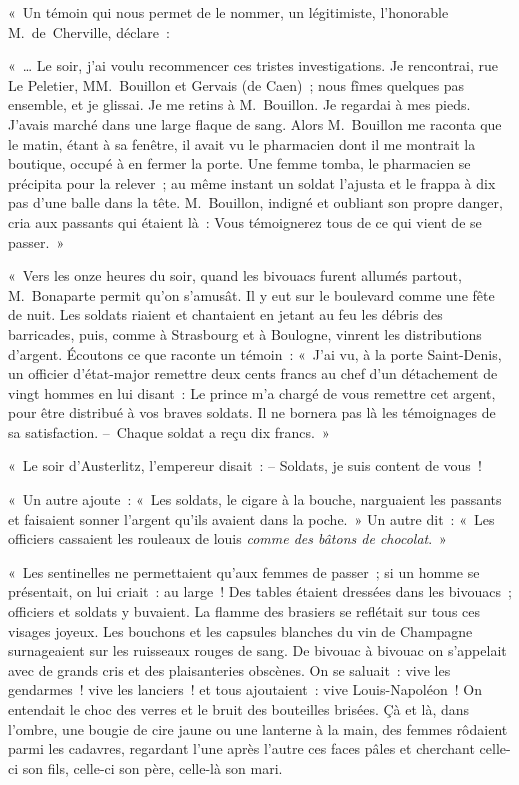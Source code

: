 \documentclass[french,twoside]{book} %
\newenvironment{quoteblock}%
  {\begin{quoting}}
  {\end{quoting}}
\newenvironment{quotebar}{%
    \def\FrameCommand{{\color{rubric!10!}\vrule width 0.5em} \hspace{0.9em}}%
    \def\OuterFrameSep{\itemsep} %
    \MakeFramed {\advance\hsize-\width \FrameRestore}
  }%
  {%
    \endMakeFramed
  }
\renewenvironment{quoteblock}%
  {%
    \savenotes
    \setstretch{0.9}
    \normalfont
    \begin{quotebar}
  }
  {%
    \end{quotebar}
    \spewnotes
  }
\begin{document}
\noindent « Un témoin qui nous permet de le nommer, un légitimiste, l’honorable M. de Cherville, déclare :\par

\begin{quoteblock}
 \noindent « … Le soir, j’ai voulu recommencer ces tristes investigations. Je rencontrai, rue Le Peletier, MM. Bouillon et Gervais (de Caen) ; nous fîmes quelques pas ensemble, et je glissai. Je me retins à M. Bouillon. Je regardai à mes pieds. J’avais marché dans une large flaque de sang. Alors M. Bouillon me raconta que le matin, étant à sa fenêtre, il avait vu le pharmacien dont il me montrait la boutique, occupé à en fermer la porte. Une femme tomba, le pharmacien se précipita pour la relever ; au même instant un soldat l’ajusta et le frappa à dix pas d’une balle dans la tête. M. Bouillon, indigné et oubliant son propre danger, cria aux passants qui étaient là : Vous témoignerez tous de ce qui vient de se passer. »\par
 « Vers les onze heures du soir, quand les bivouacs furent allumés partout, M. Bonaparte permit qu’on s’amusât. Il y eut sur le boulevard comme une fête de nuit. Les soldats riaient et chantaient en jetant au feu les débris des barricades, puis, comme à Strasbourg et à Boulogne, vinrent les distributions d’argent. Écoutons ce que raconte un témoin : « J’ai vu, à la porte Saint-Denis, un officier d’état-major remettre deux cents francs au chef d’un détachement de vingt hommes en lui disant : Le prince m’a chargé de vous remettre cet argent, pour être distribué à vos braves soldats. Il ne bornera pas là les témoignages de sa satisfaction. – Chaque soldat a reçu dix francs. »
 \end{quoteblock}

\noindent « Le soir d’Austerlitz, l’empereur disait : – Soldats, je suis content de vous !\par
« Un autre ajoute : « Les soldats, le cigare à la bouche, narguaient les passants et faisaient sonner l’argent qu’ils avaient dans la poche. » Un autre dit : « Les officiers cassaient les rouleaux de louis \emph{comme des bâtons de chocolat}. »\par
« Les sentinelles ne permettaient qu’aux femmes de passer ; si un homme se présentait, on lui criait : au large ! Des tables étaient dressées dans les bivouacs ; officiers et soldats y buvaient. La flamme des brasiers se reflétait sur tous ces visages joyeux. Les bouchons et les capsules blanches du vin de Champagne surnageaient sur les ruisseaux rouges de sang. De bivouac à bivouac on s’appelait avec de grands cris et des plaisanteries obscènes. On se saluait : vive les gendarmes ! vive les lanciers ! et tous ajoutaient : vive Louis-Napoléon ! On entendait le choc des verres et le bruit des bouteilles brisées. Çà et là, dans l’ombre, une bougie de cire jaune ou une lanterne à la main, des femmes rôdaient parmi les cadavres, regardant l’une après l’autre ces faces pâles et cherchant celle-ci son fils, celle-ci son père, celle-là son mari.
\end{document}
